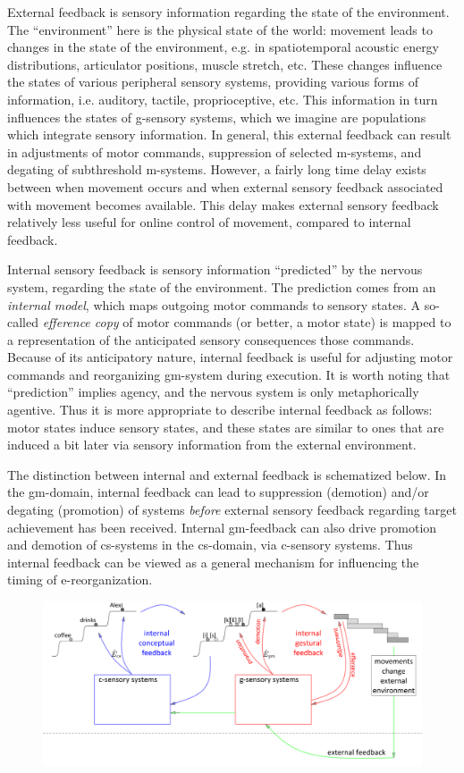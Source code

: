   External feedback is sensory information regarding the state of the environment. The “environment” here is the physical state of the world: movement leads to changes in the state of the environment, e.g. in spatiotemporal acoustic energy distributions, articulator positions, muscle stretch, etc. These changes influence the states of various peripheral sensory systems, providing various forms of information, i.e. auditory, tactile, proprioceptive, etc. This information in turn influences the states of g-sensory systems, which we imagine are populations which integrate sensory information. In general, this external feedback can result in adjustments of motor commands, suppression of selected m-systems, and degating of subthreshold m-systems. However, a fairly long time delay exists between when movement occurs and when external sensory feedback associated with movement becomes available. This delay makes external sensory feedback relatively less useful for online control of movement, compared to internal feedback. 

  Internal sensory feedback is sensory information “predicted” by the nervous system, regarding the state of the environment. The prediction comes from an \textit{internal model}, which maps outgoing motor commands to sensory states. A so-called \textit{efference copy} of motor commands (or better, a motor state) is mapped to a representation of the anticipated sensory consequences those commands. Because of its anticipatory nature, internal feedback is useful for adjusting motor commands and reorganizing gm-system during execution. It is worth noting that “prediction” implies agency, and the nervous system is only metaphorically agentive. Thus it is more appropriate to describe internal feedback as follows: motor states induce sensory states, and these states are similar to ones that are induced a bit later via sensory information from the external environment.

The distinction between internal and external feedback is schematized below. In the gm-domain, internal feedback can lead to suppression (demotion) and/or degating (promotion) of systems \textit{before} external sensory feedback regarding target achievement has been received. Internal gm-feedback can also drive promotion and demotion of cs-systems in the cs-domain, via c-sensory systems. Thus internal feedback can be viewed as a general mechanism for influencing the timing of e-reorganization.

  
\begin{figure}
\includegraphics[width=\textwidth]{figures/Tilsen-img57.png}
\caption{\missingcaption}
\label{fig:}
\end{figure}
       

